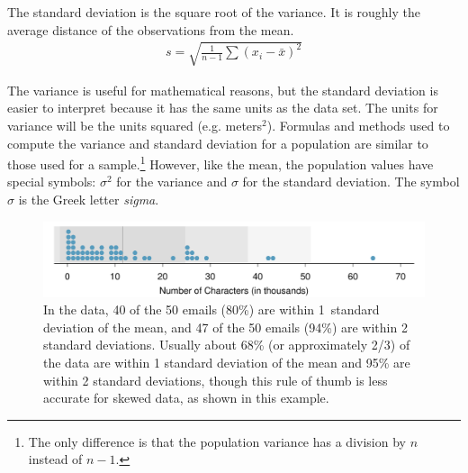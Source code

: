 
\begin{termBox}{
The standard deviation is the square root of the variance. It is roughly the average distance of the observations from the mean.
\begin{eqnarray}
\label{sdEquation}
s = \sqrt{\frac{1}{n-1} \sum{(x_i -  \bar{x})^2}}
\end{eqnarray}
}
\end{termBox}

The variance is useful for mathematical reasons, but the standard deviation is easier to interpret because it has the same units as the data set. The units for variance will be the units squared (e.g. meters$^2$).
Formulas and methods used to compute the variance and standard deviation for a population are similar to those used for a sample.\footnote{The only difference is that the population variance has a division by $n$ instead of $n-1$.} However, like the mean, the population values have special symbols: $\sigma_{}^2$ for the variance and $\sigma$ for the standard deviation. The symbol $\sigma$  is the Greek letter \emph{sigma}.

\begin{figure}
\centering
\includegraphics[width=\textwidth]{ch_summarizing_data/figures/emailCharactersDotPlot/emailCharactersDotPlotStackedRoundedWithSD}
\caption{In the  data, 40 of the 50 emails (80\%) are within 1~standard deviation of the mean, and 47 of the 50 emails (94\%) are within 2 standard deviations. Usually about 68\% (or approximately 2/3) of the data are within 1 standard deviation of the mean and 95\% are within 2 standard deviations, though this rule of thumb is less accurate for skewed data, as shown in this example.}
\label{emailCharactersDotPlotStackedRoundedWithSD}
\end{figure}

